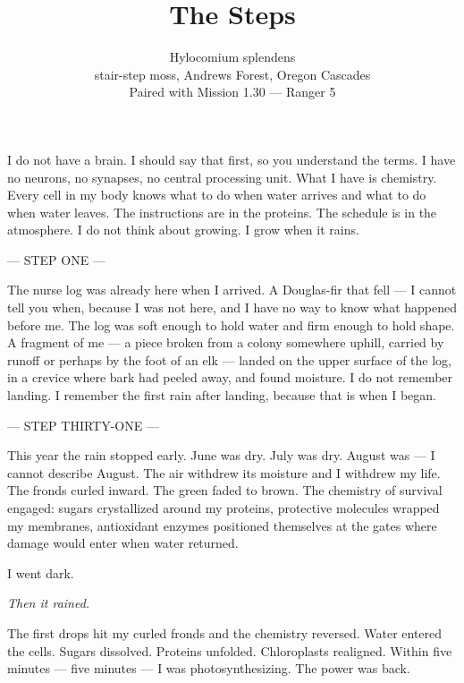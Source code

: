 \documentclass[12pt]{article}
\title{The Steps}
\author{Hylocomium splendens\\
\small stair-step moss, Andrews Forest, Oregon Cascades\\
\small Paired with Mission 1.30 --- Ranger 5}
\date{}
\begin{document}
\maketitle
\thispagestyle{empty}

\noindent I do not have a brain. I should say that first, so you understand the terms. I have no neurons, no synapses, no central processing unit. What I have is chemistry. Every cell in my body knows what to do when water arrives and what to do when water leaves. The instructions are in the proteins. The schedule is in the atmosphere. I do not think about growing. I grow when it rains.

\begin{center}
--- STEP ONE ---
\end{center}

\indent The nurse log was already here when I arrived. A Douglas-fir that fell --- I cannot tell you when, because I was not here, and I have no way to know what happened before me. The log was soft enough to hold water and firm enough to hold shape. A fragment of me --- a piece broken from a colony somewhere uphill, carried by runoff or perhaps by the foot of an elk --- landed on the upper surface of the log, in a crevice where bark had peeled away, and found moisture. I do not remember landing. I remember the first rain after landing, because that is when I began.

\begin{center}
--- STEP THIRTY-ONE ---
\end{center}

\indent This year the rain stopped early. June was dry. July was dry. August was --- I cannot describe August. The air withdrew its moisture and I withdrew my life. The fronds curled inward. The green faded to brown. The chemistry of survival engaged: sugars crystallized around my proteins, protective molecules wrapped my membranes, antioxidant enzymes positioned themselves at the gates where damage would enter when water returned.

I went dark.

\begin{center}
\textit{Then it rained.}
\end{center}

\indent The first drops hit my curled fronds and the chemistry reversed. Water entered the cells. Sugars dissolved. Proteins unfolded. Chloroplasts realigned. Within five minutes --- five minutes --- I was photosynthesizing. The power was back.
\end{document}

